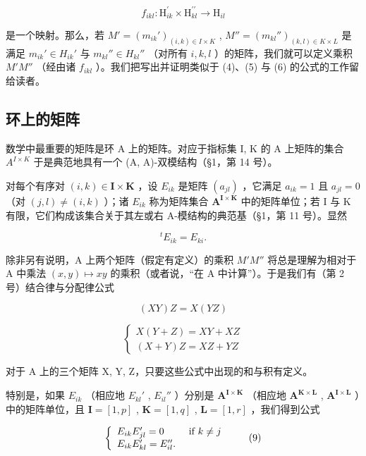 \[
f _ {i k l}: \mathrm{H} _ {i k} ^ {\prime} \times \mathrm{H} _ {k l} ^ {\prime \prime} \rightarrow \mathrm{H} _ {i l}
\]

是一个映射。那么，若 \(M' = (m_{ik}')_{(i,k) \in I \times K}\) , \(M'' = (m_{kl}'')_{(k,l) \in K \times L}\) 是满足 \(m_{ik}' \in H_{ik}'\) 与 \(m_{kl}'' \in H_{kl}''\) （对所有 \(i, k, l\) ）的矩阵，我们就可以定义乘积 \(M'M''\) （经由诸 \(f_{ikl}\) ）。我们把写出并证明类似于 (4)、(5) 与 (6) 的公式的工作留给读者。

\subsection{环上的矩阵}

数学中最重要的矩阵是环 A 上的矩阵。对应于指标集 I, K 的 A 上矩阵的集合 \(A^{I \times K}\) 于是典范地具有一个 (A, A)-双模结构（§1，第 14 号）。

对每个有序对 \((i,k)\in\mathbf{I}\times\mathbf{K}\) ，设 \(E_{ik}\) 是矩阵 \((a_{jl})\) ，它满足 \(a_{ik}=1\) 且 \(a_{jl}=0\) （对 \((j,l)\neq(i,k)\) ）；诸 \(E_{ik}\) 称为矩阵集合 \(\mathbf{A}^{\mathbf{I}\times\mathbf{K}}\) 中的矩阵单位；若 I 与 K 有限，它们构成该集合关于其左或右 A-模结构的典范基（§1，第 11 号）。显然

\[
{ } ^ { t } E _ { i k } = E _ { k i } .
\]

除非另有说明，A 上两个矩阵（假定有定义）的乘积 \(M'M''\) 将总是理解为相对于 A 中乘法 \((x,y)\mapsto xy\) 的乘积（或者说，“在 A 中计算”）。于是我们有（第 2 号）结合律与分配律公式

\[
(X Y) Z = X (Y Z)\tag{7}
\]

\[
\left\{ \begin{array}{l} X (Y + Z) = X Y + X Z \\ (X + Y) Z = X Z + Y Z \end{array} \right.\tag{8}
\]

对于 A 上的三个矩阵 X, Y, Z，只要这些公式中出现的和与积有定义。

特别是，如果 \(E_{ik}\) （相应地 \(E_{kl}'\) , \(E_{il}''\) ）分别是 \(\mathbf{A}^{\mathbf{I} \times \mathbf{K}}\) （相应地 \(\mathbf{A}^{\mathbf{K} \times \mathbf{L}}\) , \(\mathbf{A}^{\mathbf{I} \times \mathbf{L}}\) ）中的矩阵单位，且 \(\mathbf{I} = [1, p]\) , \(\mathbf{K} = [1, q]\) , \(\mathbf{L} = [1, r]\) ，我们得到公式

\[
\left\{ \begin{array}{l l} E _ {i k} E _ {j l} ^ {\prime} = 0 & \text { if } k \neq j \\ E _ {i k} E _ {k l} ^ {\prime} = E _ {i l} ^ {\prime \prime}. \end{array} \right.\tag{9}
\]


